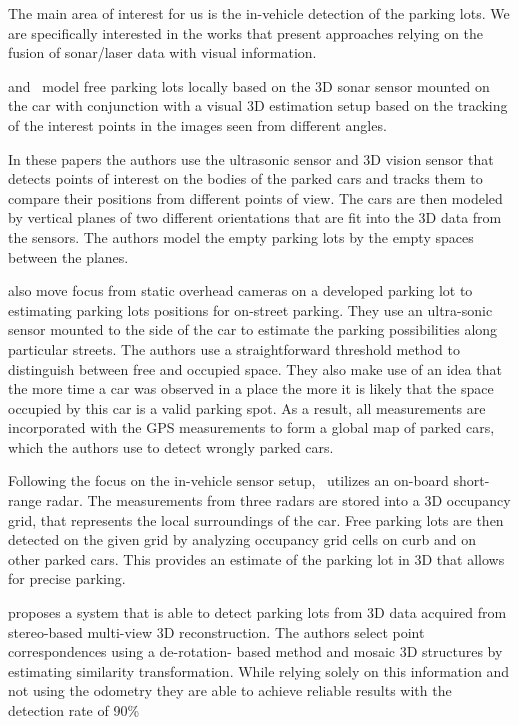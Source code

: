 The main area of interest for us is the in-vehicle detection of the parking
lots. We are specifically interested in the works that present approaches
relying on the fusion of sonar/laser data with visual information.

\citet{fintyelvestri} and~\citet{abadvestri} model free parking lots locally
based on the 3D sonar sensor mounted on the car with conjunction with a visual
3D estimation setup based on the tracking of the interest points in the images
seen from different angles.

In these papers the authors use the ultrasonic sensor and 3D vision sensor
that detects points of interest on the bodies of the parked cars and tracks
them to compare their positions from different points of view. The cars are
then modeled by vertical planes of two different orientations that are fit
into the 3D data from the sensors. The authors model the empty parking lots by
the empty spaces between the planes.

\citet{vladimircoric} also move focus from static overhead cameras on a
developed parking lot to estimating parking lots positions for on-street
parking. They use an ultra-sonic sensor mounted to the side of the car to
estimate the parking possibilities along particular streets. The authors use a
straightforward threshold method to distinguish between free and occupied
space. They also make use of an idea that the more time a car was observed in
a place the more it is likely that the space occupied by this car is a valid
parking spot. As a result, all measurements are incorporated with the GPS
measurements to form a global map of parked cars, which the authors use to
detect wrongly parked cars.

Following the focus on the in-vehicle sensor setup,~\citet{schmid11} utilizes
an on-board short-range radar. The measurements from three radars are stored
into a 3D occupancy grid, that represents the local surroundings of the car.
Free parking lots are then detected on the given grid by analyzing occupancy
grid cells on curb and on other parked cars. This provides an estimate of the
parking lot in 3D that allows for precise parking.

\citet{suhr10} proposes a system that is able to detect parking lots from 3D
data acquired from stereo-based multi-view 3D reconstruction. The authors
select point correspondences using a de-rotation- based method and mosaic 3D
structures by estimating similarity transformation. While relying solely on
this information and not using the odometry they are able to achieve reliable
results with the detection rate of 90\%

